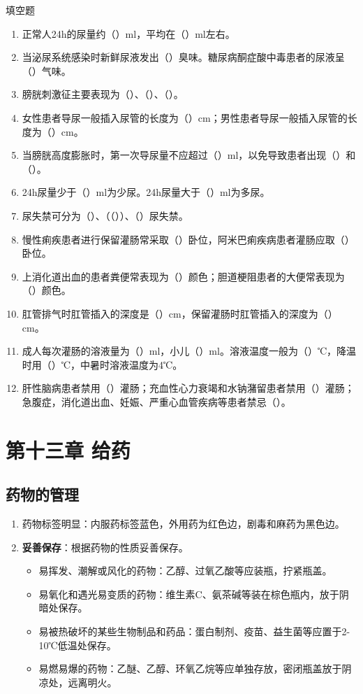 \documentclass[11pt, a4paper]{ctexart}
\begin{document}
\begin{tipsbox}{填空题}
	\begin{enumerate}
		\item 正常人24h的尿量约（\qquad）ml，平均在（\qquad）ml左右。
		\item 当泌尿系统感染时新鲜尿液发出（\qquad）臭味。糖尿病酮症酸中毒患者的尿液呈（\qquad）气味。
		\item 膀胱刺激征主要表现为（\qquad）、（\qquad）、（\qquad）。
		\item 女性患者导尿一般插入尿管的长度为（\qquad）cm；男性患者导尿一般插入尿管的长度为（\qquad）cm。
		\item 当膀胱高度膨胀时，第一次导尿量不应超过（\qquad）ml，以免导致患者出现（\qquad）和（\qquad）。
		\item 24h尿量少于（\qquad）ml为少尿。24h尿量大于（\qquad）ml为多尿。
		\item 尿失禁可分为（\qquad）、（\qquad（\qquad））、（\qquad）尿失禁。
		\item 慢性痢疾患者进行保留灌肠常采取（\qquad）卧位，阿米巴痢疾病患者灌肠应取（\qquad）卧位。
		\item 上消化道出血的患者粪便常表现为（\qquad）颜色；胆道梗阻患者的大便常表现为（\qquad）颜色。
		\item 肛管排气时肛管插入的深度是（\qquad）cm，保留灌肠时肛管插入的深度为（\qquad）cm。
		\item 成人每次灌肠的溶液量为（\qquad）ml，小儿（\qquad）ml。溶液温度一般为（\qquad）℃，降温时用（\qquad）℃，中暑时溶液温度为4℃。
		\item 肝性脑病患者禁用（\qquad）灌肠；充血性心力衰竭和水钠潴留患者禁用（\qquad）灌肠；急腹症，消化道出血、妊娠、严重心血管疾病等患者禁忌（\qquad）。
	\end{enumerate}
\end{tipsbox}

\section{第十三章 给药}
\subsection{药物的管理}
\begin{enumerate}
	\item 药物标签明显：内服药标签蓝色，外用药为红色边，剧毒和麻药为黑色边。
	\item \textbf{妥善保存}：根据药物的性质妥善保存。
	      \begin{itemize}
		      \item 易挥发、潮解或风化的药物：乙醇、过氧乙酸等应装瓶，拧紧瓶盖。
		      \item 易氧化和遇光易变质的药物：维生素C、氨茶碱等装在棕色瓶内，放于阴暗处保存。
		      \item 易被热破坏的某些生物制品和药品：蛋白制剂、疫苗、益生菌等应置于2-10℃低温处保存。
		      \item 易燃易爆的药物：乙醚、乙醇、环氧乙烷等应单独存放，密闭瓶盖放于阴凉处，远离明火。
	      \end{itemize}
\end{enumerate}
\end{document}
